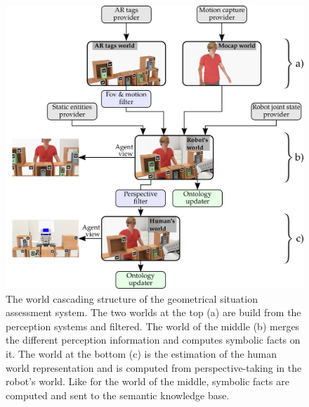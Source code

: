 \begin{figure}[ht!]
\centering
\includegraphics[width=\textwidth]{figures/chapter9/uwds/uwds.png}
\caption{\label{fig:chap9_uwds} The world cascading structure of the geometrical situation assessment system. The two worlds at the top (a) are build from the perception systems and filtered. The world of the middle (b) merges the different perception information and computes symbolic facts on it. The world at the bottom (c) is the estimation of the human world representation and is computed from perspective-taking in the robot's world. Like for the world of the middle, symbolic facts are computed and sent to the semantic knowledge base.}
\end{figure}


